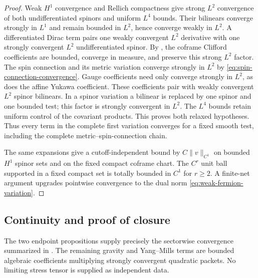 \documentclass[11pt]{article}
\numberwithin{equation}{section}
\theoremstyle{definition}
\theoremstyle{remark}
\newcommand{\norm}[1]{\lVert#1\rVert}
\begin{document}
\begin{proof}
Weak $H^1$ convergence and Rellich compactness give strong $L^2$
convergence of both undifferentiated spinors and uniform $L^4$ bounds.
Their bilinears converge strongly in $L^1$ and remain bounded in $L^2$,
hence converge weakly in $L^2$.  A differentiated Dirac term pairs one
weakly convergent $L^2$ derivative with one strongly convergent $L^2$
undifferentiated spinor.  By , the coframe Clifford
coefficients are bounded, converge in measure, and preserve this strong
$L^2$ factor.  The spin connection and its metric variation converge
strongly in $L^2$ by \eqref{eq:spin-connection-convergence}.  Gauge
coefficients need only converge strongly in $L^2$, as does the affine
Yukawa coefficient. These coefficients pair with weakly convergent $L^2$
spinor bilinears. In a spinor variation a bilinear is replaced by one
spinor and one bounded test; this factor is strongly convergent in $L^2$.
The $L^4$ bounds retain uniform control of the covariant products. This
proves both relaxed hypotheses.  Thus every term in the complete
first variation converges for a fixed smooth test, including the complete
metric--spin-connection chain.

The same expansions give a cutoff-independent bound by
$C\norm v_{C^1}$ on bounded $H^1$ spinor sets and on the fixed compact
coframe chart.  The $C^r$ unit ball supported in a fixed compact set is
totally bounded in $C^1$ for $r\ge2$.  A finite-net argument upgrades
pointwise convergence to the dual norm \eqref{eq:weak-fermion-variation}.
\end{proof}

\subsection{Continuity and proof of closure}
\label{subsec:closure-proof}

The two endpoint propositions supply precisely the sectorwise convergence
summarized in . The remaining gravity and
Yang--Mills terms are bounded algebraic coefficients multiplying strongly
convergent quadratic packets. No limiting stress tensor is supplied as
independent data.
\end{document}
